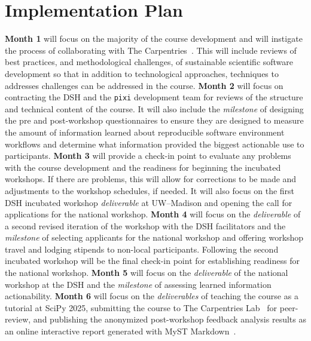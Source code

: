 \documentclass[letterpaper, 11pt]{article}
\newcommand{\institute}{UW--Madison}
\newcommand{\pixi}{\texttt{pixi}}
\begin{document}
\section{Implementation Plan}


\textbf{Month 1} will focus on the majority of the course development and will instigate the process of collaborating with The Carpentries~\cite{the_carpentries_org}.
This will include reviews of best practices, and methodological challenges, of sustainable scientific software development so that in addition to technological approaches, techniques to addresses challenges can be addressed in the course.
\textbf{Month 2} will focus on contracting the DSH and the \pixi{} development team for reviews of the structure and technical content of the course.
It will also include the \emph{milestone} of designing the pre and post-workshop questionnaires to ensure they are designed to measure the amount of information learned about reproducible software environment workflows and determine what information provided the biggest actionable use to participants.
\textbf{Month 3} will provide a check-in point to evaluate any problems with the course development and the readiness for beginning the incubated workshops.
If there are problems, this will allow for corrections to be made and adjustments to the workshop schedules, if needed.
It will also focus on the first DSH incubated workshop \emph{deliverable} at \institute{} and opening the call for applications for the national workshop.
\textbf{Month 4} will focus on the \emph{deliverable} of a second revised iteration of the workshop with the DSH facilitators and the \emph{milestone} of selecting applicants for the national workshop and offering workshop travel and lodging stipends to non-local participants.
Following the second incubated workshop will be the final check-in point for establishing readiness for the national workshop.
\textbf{Month 5} will focus on the \emph{deliverable} of the national workshop at the DSH and the \emph{milestone} of assessing learned information actionability.
\textbf{Month 6} will focus on the \emph{deliverables} of teaching the course as a tutorial at SciPy 2025, submitting the course to The Carpentries Lab~\cite{carpentries_lab} for peer-review, and publishing the anonymized post-workshop feedback analysis results as an online interactive report generated with MyST Markdown~\cite{executable_books_community}.
\end{document}
